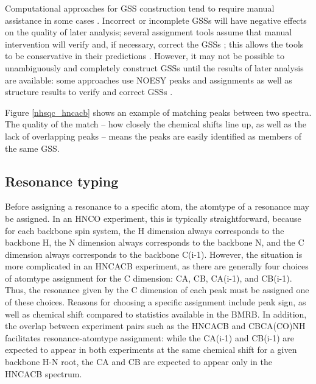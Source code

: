 Computational approaches for GSS construction tend to require manual 
assistance in some cases \cite{autoassign1997, mars}.  Incorrect or 
incomplete GSSs will have negative effects on the quality of later 
analysis; several assignment tools assume that manual intervention will 
verify and, if necessary, correct the GSSs \cite{williamson2009automated}; 
this allows the tools to be conservative in their 
predictions \cite{autoassign1997}.  However, it may not be 
possible to unambiguously and completely construct GSSs until the results 
of later analysis are available: some approaches use NOESY peaks and 
assignments as well as structure results to verify and correct GSSs 
\cite{autoassign1997}.

Figure \ref{nhsqc_hncacb} shows an example of matching peaks between two
spectra.  The quality of the match -- how closely the chemical shifts line up,
as well as the lack of overlapping peaks -- means the peaks are easily
identified as members of the same GSS.

\subsection{Resonance typing}
Before assigning a resonance to a specific 
atom, the atomtype of a resonance may be assigned.  In an HNCO experiment, 
this is typically straightforward, because for each backbone spin system, 
the H dimension always corresponds to the backbone H, the N dimension always 
corresponds to the backbone N, and the C dimension always corresponds to the 
backbone C(i-1).  However, the situation is more complicated in an HNCACB 
experiment, as there are generally four choices of atomtype assignment for 
the C dimension:  CA, CB, CA(i-1), and CB(i-1).  Thus, the resonance given 
by the C dimension of each peak must be assigned one of these choices.  
Reasons for choosing a specific assignment include peak sign, as well as 
chemical shift compared to statistics available in the BMRB.  In addition, 
the overlap between experiment pairs such as the HNCACB and CBCA(CO)NH 
facilitates resonance-atomtype assignment: while the CA(i-1) and CB(i-1) 
are expected to appear in both experiments at the same chemical shift for 
a given backbone H-N root, the CA and CB are expected to appear only in the 
HNCACB spectrum.


